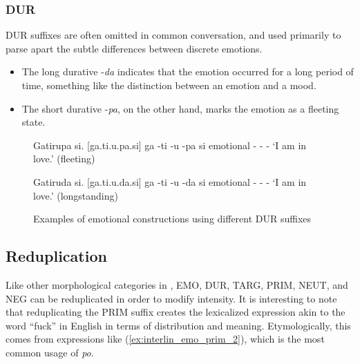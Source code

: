 		\subsubsection{DUR}
			DUR suffixes are often omitted in common conversation, and used primarily to parse apart the subtle differences between discrete emotions.
				\begin{itemize}
					\item The long durative -\emph{da} indicates that the emotion occurred for a long period of time, something like the distinction between an emotion and a mood.
					\item The short durative -\emph{pa}, on the other hand, marks the emotion as a fleeting state.
				\end{itemize}

			\begin{figure}[H] %
			\label{interlin_emo_dur}

				\begin{example}
				\label{ex:interlin_emo_dur_1}
					Gatirupa si. [ga.\stress ti.\R u.pa.si]
					\gll ga -ti -\R u -pa si
					emotional - - - \cop
					\glt `I am in love.' (fleeting)
					\glend
				\end{example}

				\begin{example}
				\label{ex:interlin_emo_dur_2}
					Gatiruda si. [ga.\stress ti.\R u.da.si]
					\gll ga -ti -\R u -da si
					emotional - - -\D{dur:long} \cop
					\glt `I am in love.' (longstanding)
					\glend
				\end{example}

			\caption{Examples of emotional constructions using different DUR suffixes}
			\end{figure}

	\subsection{Reduplication}
		Like other morphological categories in {\kurango}, EMO, DUR, TARG, PRIM, NEUT, and NEG can be reduplicated in order to modify intensity. It is interesting to note that reduplicating the PRIM suffix creates the lexicalized expression akin to the word ``fuck'' in English in terms of distribution and meaning. Etymologically, this comes from expressions like (\ref{ex:interlin_emo_prim_2}), which is the most common usage of \emph{po}.


